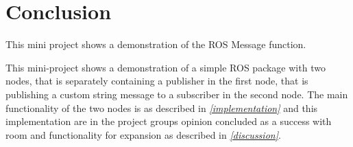 \chapter{Conclusion}

This mini project shows a demonstration of the ROS Message function.

\vspace{10mm}

This mini-project shows a demonstration of a simple ROS package with two nodes, that is separately containing a publisher in the first node, that is publishing a custom string message to a subscriber in the second node. The main functionality of the two nodes is as described in \textit{\autoref{implementation}} and this implementation are in the project groups opinion concluded as a success with room and functionality for expansion as described in \textit{\autoref{discussion}}.

